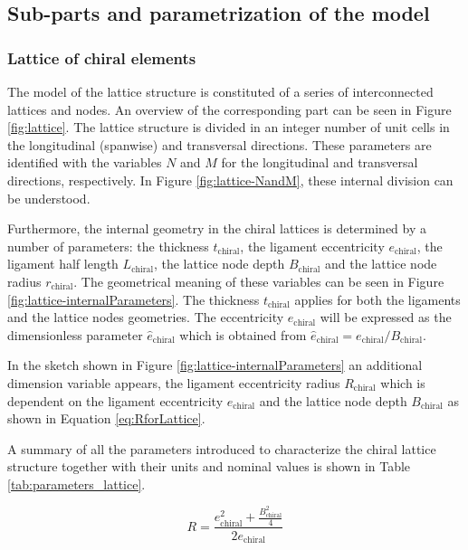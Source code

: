 \subsection{Sub-parts and parametrization of the model} \label{subsec:parametrization_Model}

\subsubsection{Lattice of chiral elements} \label{subsubsec:lattice_Parametrization}

The model of the lattice structure is constituted of a series of interconnected lattices and nodes. An overview of the corresponding part can be seen in Figure \ref{fig:lattice}. The lattice structure is divided in an integer number of unit cells in the longitudinal (spanwise) and transversal directions. These parameters are identified with the variables $N$ and $M$ for the longitudinal and transversal directions, respectively. In Figure \ref{fig:lattice-NandM}, these internal division can be understood.

Furthermore, the internal geometry in the chiral lattices is determined by a number of parameters: the thickness $t_{\mathrm{chiral}}$, the ligament eccentricity $e_{\mathrm{chiral}}$, the ligament half length $L_{\mathrm{chiral}}$, the lattice node depth $B_{\mathrm{chiral}}$ and the lattice node radius $r_{\mathrm{chiral}}$. The geometrical meaning of these variables can be seen in Figure \ref{fig:lattice-internalParameters}. The thickness $t_{\mathrm{chiral}}$ applies for both the ligaments and the lattice nodes geometries. The eccentricity $e_{\mathrm{chiral}}$ will be expressed as the dimensionless parameter $\hat{e}_{\mathrm{chiral}}$ which is obtained from $\hat{e}_{\mathrm{chiral}} = e_{\mathrm{chiral}} / B_{\mathrm{chiral}}$.

In the sketch shown in Figure \ref{fig:lattice-internalParameters} an additional dimension variable appears, the ligament eccentricity radius $R_{\mathrm{chiral}}$ which is dependent on the ligament eccentricity $e_{\mathrm{chiral}}$ and the lattice node depth $B_{\mathrm{chiral}}$ as shown in Equation \ref{eq:RforLattice}. 

A summary of all the parameters introduced to characterize the chiral lattice structure together with their units and nominal values is shown in Table \ref{tab:parameters_lattice}. 

\begin{equation}\label{eq:RforLattice}
  R = \frac{e_{\mathrm{chiral}}^2 + \frac{B_{\mathrm{chiral}}^2}{4}}{2e_{\mathrm{chiral}}}
\end{equation}

